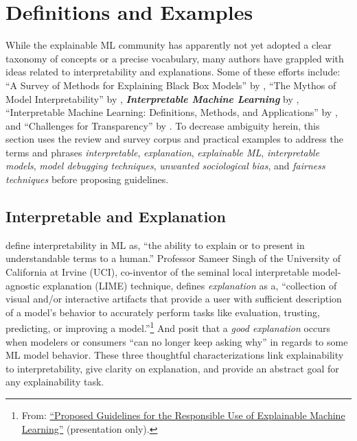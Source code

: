 \documentclass{article}
\begin{document}
\section{Definitions and Examples} \label{sec:intro}

While the explainable ML community has apparently not yet adopted a clear taxonomy of concepts or a precise vocabulary, many authors have grappled with ideas related to interpretability and explanations. Some of these efforts include: ``A Survey of Methods for Explaining Black Box Models''  by \citet{guidotti2018survey}, ``The Mythos of Model Interpretability'' by \citet{lipton1}, \textit{\textbf{Interpretable Machine Learning}} by \citet{molnar}, ``Interpretable Machine Learning: Definitions,
Methods, and Applications'' by \citet{murdoch2019interpretable}, and ``Challenges for Transparency''  by \citet{weller2017challenges}. To decrease ambiguity herein, this section uses the review and survey corpus and practical examples to address the terms and phrases \textit{interpretable}, \textit{explanation}, \textit{explainable ML}, \textit{interpretable models}, \textit{model debugging techniques}, \textit{unwanted sociological bias}, and \textit{fairness techniques} before proposing guidelines.

\subsection{Interpretable and Explanation}

\citet{been_kim1} define interpretability in ML as, ``the ability to explain or to present in understandable terms to a human.'' Professor Sameer Singh of the University of California at Irvine (UCI), co-inventor of the seminal local interpretable model-agnostic explanation (LIME) technique, defines \textit{explanation} as a, ``collection of visual and/or interactive artifacts that provide a user with sufficient description of a model's behavior to accurately perform tasks like evaluation, trusting, predicting, or improving a model.''\footnote{\scriptsize{From: \href{https://github.com/jphall663/kdd_2019}{``Proposed Guidelines for the Responsible Use of Explainable Machine Learning''} (presentation only).}} And \citet{gilpin2018explaining} posit that a \textit{good explanation} occurs when modelers or consumers ``can no longer keep asking why'' in regards to some ML model behavior. These three thoughtful characterizations link explainability to interpretability, give clarity on explanation, and provide an abstract goal for any explainability task.
\end{document}
